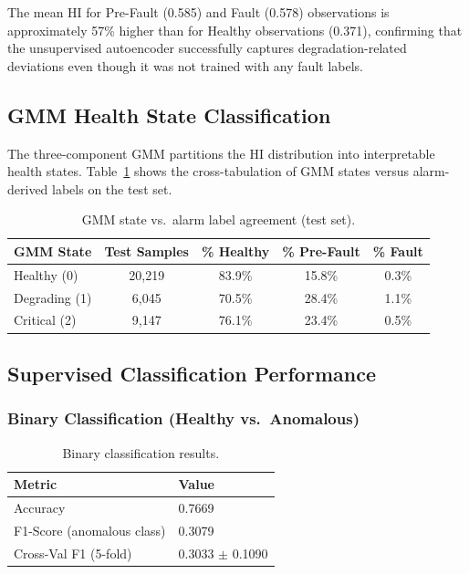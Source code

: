 \documentclass[preprint,12pt]{elsarticle}
\begin{document}
The mean HI for Pre-Fault (0.585) and Fault (0.578) observations is approximately 57\% higher than for Healthy observations (0.371), confirming that the unsupervised autoencoder successfully captures degradation-related deviations even though it was not trained with any fault labels.

\subsection{GMM Health State Classification}

The three-component GMM partitions the HI distribution into interpretable health states. Table~\ref{tab:gmm_results} shows the cross-tabulation of GMM states versus alarm-derived labels on the test set.

\begin{table}[H]
\centering
\caption{GMM state vs.\ alarm label agreement (test set).}
\label{tab:gmm_results}
\begin{tabular}{lcccc}
\toprule
GMM State & Test Samples & \% Healthy & \% Pre-Fault & \% Fault \\
\midrule
Healthy (0) & 20,219 & 83.9\% & 15.8\% & 0.3\% \\
Degrading (1) & 6,045 & 70.5\% & 28.4\% & 1.1\% \\
Critical (2) & 9,147 & 76.1\% & 23.4\% & 0.5\% \\
\bottomrule
\end{tabular}
\end{table}

\subsection{Supervised Classification Performance}

\subsubsection{Binary Classification (Healthy vs.\ Anomalous)}

\begin{table}[H]
\centering
\caption{Binary classification results.}
\label{tab:binary_results}
\begin{tabular}{ll}
\toprule
Metric & Value \\
\midrule
Accuracy & 0.7669 \\
F1-Score (anomalous class) & 0.3079 \\
Cross-Val F1 (5-fold) & 0.3033 $\pm$ 0.1090 \\
\bottomrule
\end{tabular}
\end{table}
\end{document}
